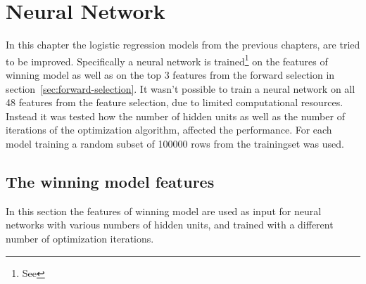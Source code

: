 \chapter{Neural Network}
In this chapter the logistic regression models from the previous chapters, are tried to be improved. Specifically a neural network is trained\footnote{See } on the features of winning model as well as on the top 3 features from the forward selection in section~\ref{sec:forward-selection}. It wasn't possible to train a neural network on all 48 features from the feature selection, due to limited computational resources. Instead it was tested how the number of hidden units as well as the number of iterations of the optimization algorithm, affected the performance. For each model training a random subset of 100000 rows from the trainingset was used.

\section{The winning model features}
In this section the features of winning model are used as input for neural networks with various numbers of hidden units, and trained with a different number of optimization iterations.


